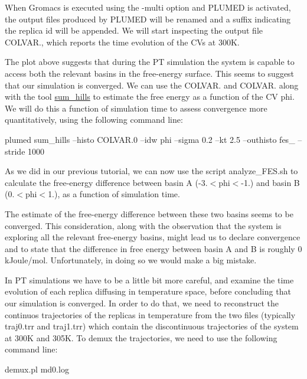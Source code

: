 When Gromacs is executed using the -\/multi option and P\+L\+U\+M\+E\+D is activated, the output files produced by P\+L\+U\+M\+E\+D will be renamed and a suffix indicating the replica id will be appended. We will start inspecting the output file C\+O\+L\+V\+A\+R., which reports the time evolution of the C\+Vs at 300\+K.

\label{belfast-7_belfast-7-pt-fig}%
\hypertarget{belfast-7_belfast-7-pt-fig}{}%
 The plot above suggests that during the P\+T simulation the system is capable to access both the relevant basins in the free-\/energy surface. This seems to suggest that our simulation is converged. We can use the C\+O\+L\+V\+A\+R. and C\+O\+L\+V\+A\+R. along with the tool \hyperlink{sum_hills}{sum\+\_\+hills} to estimate the free energy as a function of the C\+V phi. We will do this a function of simulation time to assess convergence more quantitatively, using the following command line\+:

\begin{DoxyVerb}plumed sum_hills --histo COLVAR.0 --idw phi --sigma 0.2 --kt 2.5 --outhisto fes_ --stride 1000
\end{DoxyVerb}


As we did in our previous tutorial, we can now use the script analyze\+\_\+\+F\+E\+S.\+sh to calculate the free-\/energy difference between basin A (-\/3.$<$phi$<$-\/1.) and basin B (0.$<$phi$<$1.), as a function of simulation time.

\label{belfast-7_belfast-7-ptfes-fig}%
\hypertarget{belfast-7_belfast-7-ptfes-fig}{}%
 The estimate of the free-\/energy difference between these two basins seems to be converged. This consideration, along with the observation that the system is exploring all the relevant free-\/energy basins, might lead us to declare convergence and to state that the difference in free energy between basin A and B is roughly 0 k\+Joule/mol. Unfortunately, in doing so we would make a big mistake.

In P\+T simulations we have to be a little bit more careful, and examine the time evolution of each replica diffusing in temperature space, before concluding that our simulation is converged. In order to do that, we need to reconstruct the continuos trajectories of the replicas in temperature from the two files (typically traj0.\+trr and traj1.\+trr) which contain the discontinuous trajectories of the system at 300\+K and 305\+K. To demux the trajectories, we need to use the following command line\+:

\begin{DoxyVerb}demux.pl md0.log
\end{DoxyVerb}


